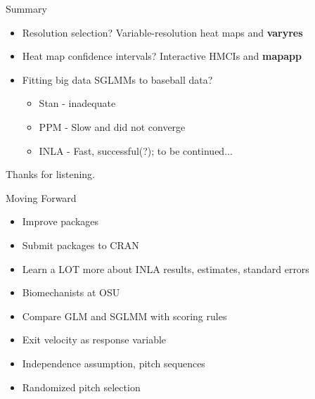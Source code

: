 \documentclass{beamer}
\begin{document}
\begin{frame}{Summary}
\begin{itemize}
\addtolength{\itemsep}{0.5\baselineskip}
\item Resolution selection? Variable-resolution heat maps and {\bf varyres}
\item Heat map confidence intervals? Interactive HMCIs and {\bf mapapp}
\item Fitting big data SGLMMs to baseball data?
  \begin{itemize}
  \addtolength{\itemsep}{0.5\baselineskip}
  \item Stan - inadequate
  \item PPM - Slow and did not converge
  \item INLA - Fast, successful(?); to be continued...
  \end{itemize}
\end{itemize}
\end{frame}

%
%
%
\begin{frame}{}
\begin{center}
\Huge{Thanks for listening.}
\end{center}
\end{frame}



\begin{frame}{Moving Forward}
\begin{itemize}
\addtolength{\itemsep}{0.5\baselineskip}
\item Improve packages
\item Submit packages to CRAN 
\item Learn a LOT more about INLA results, estimates, standard errors
\item Biomechanists at OSU
\item Compare GLM and SGLMM with scoring rules
\item Exit velocity as response variable
\item Independence assumption, pitch sequences
\item Randomized pitch selection
\end{itemize}

\end{frame}
\end{document}
